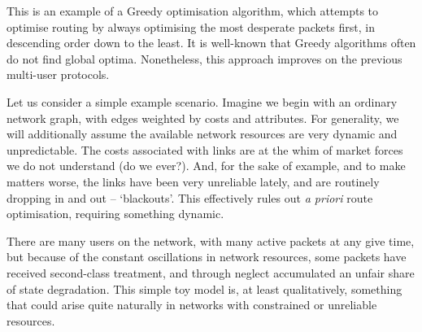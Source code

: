 \documentclass[aps,rmp,twocolumn,amsmath,amssymb,nofootinbib,superscriptaddress]{revtex4}
\begin{document}
This is an example of a {\sc Greedy} optimisation algorithm, which attempts to optimise routing by always optimising the most desperate packets first, in descending order down to the least. It is well-known that {\sc Greedy} algorithms often do not find global optima. Nonetheless, this approach improves on the previous multi-user protocols.

Let us consider a simple example scenario. Imagine we begin with an ordinary network graph, with edges weighted by costs and attributes. For generality, we will additionally assume the available network resources are very dynamic and unpredictable. The costs associated with links are at the whim of market forces we do not understand (do we ever?). And, for the sake of example, and to make matters worse, the links have been very unreliable lately, and are routinely dropping in and out -- `blackouts'. This effectively rules out \emph{a priori} route optimisation, requiring something dynamic.

There are many users on the network, with many active packets at any give time, but because of the constant oscillations in network resources, some packets have received second-class treatment, and through neglect accumulated an unfair share of state degradation. This simple toy model is, at least qualitatively, something that could arise quite naturally in networks with constrained or unreliable resources.
\end{document}
